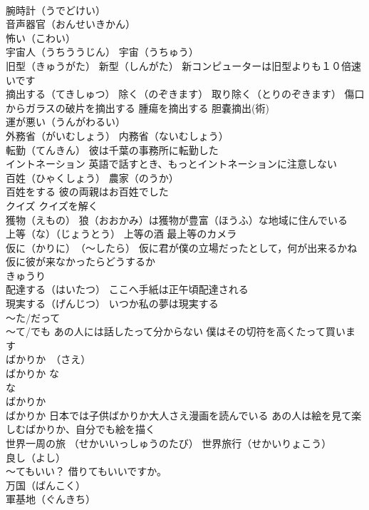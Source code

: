 \documentclass[8pt]{extreport}
\begin{document}
\begin{CJK}{UTF8}{min}
\\	腕時計（うでどけい）
\\	音声器官（おんせいきかん）
\\	怖い（こわい）
\\	宇宙人（うちううじん） 宇宙（うちゅう）
\\	旧型（きゅうがた） 新型（しんがた） 新コンピューターは旧型よりも１０倍速いです
\\	摘出する（てきしゅつ） 除く（のぞきます） 取り除く（とりのぞきます） 傷口からガラスの破片を摘出する 腫瘍を摘出する 胆嚢摘出(術)
\\	運が悪い（うんがわるい）
\\	外務省（がいむしょう） 内務省（ないむしょう）
\\	転勤（てんきん） 彼は千葉の事務所に転勤した
\\	イントネーション 英語で話すとき、もっとイントネーションに注意しない
\\	百姓（ひゃくしょう） 農家（のうか）
\\	百姓をする 彼の両親はお百姓でした
\\	クイズ クイズを解く
\\	獲物（えもの） 狼（おおかみ）は獲物が豊富（ほうふ）な地域に住んでいる
\\	上等（な）（じょうとう） 上等の酒 最上等のカメラ
\\	仮に（かりに）　（～したら） 仮に君が僕の立場だったとして，何が出来るかね 仮に彼が来なかったらどうするか
\\	きゅうり
\\	配達する（はいたつ） ここへ手紙は正午頃配達される
\\	現実する（げんじつ） いつか私の夢は現実する
\\	～た/だって 
\\	～て/でも あの人には話したって分からない 僕はその切符を高くたって買います
\\	ばかりか　（さえ） 
\\	ばかりか な 
\\	な
\\	ばかりか 
\\	ばかりか 日本では子供ばかりか大人さえ漫画を読んでいる あの人は絵を見て楽しむばかりか、自分でも絵を描く
\\	世界一周の旅 （せかいいっしゅうのたび） 世界旅行（せかいりょこう）
\\	良し（よし）
\\	～てもいい？ 借りてもいいですか。
\\	万国（ばんこく） 
\\	軍基地（ぐんきち）

\end{CJK}
\end{document}
